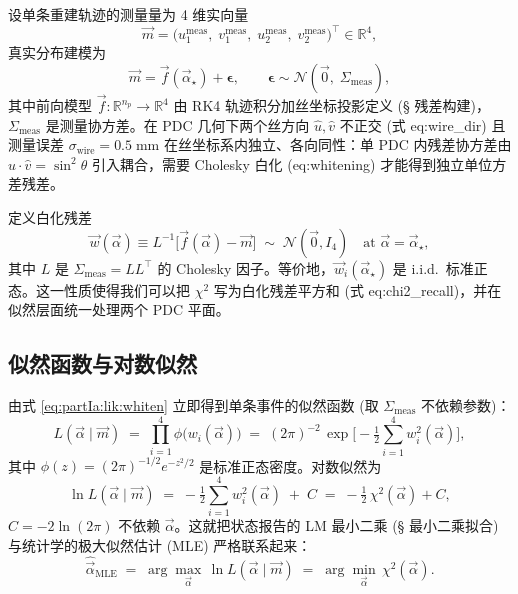 设单条重建轨迹的测量量为 4 维实向量
\begin{equation}
  \vec m = \bigl(u_1^\mathrm{meas},\; v_1^\mathrm{meas},\; u_2^\mathrm{meas},\; v_2^\mathrm{meas}\bigr)^\top \in \mathbb R^4,
  \label{eq:partIa:lik:meas}
\end{equation}
真实分布建模为
\begin{equation}
  \vec m = \vec f(\vec\alpha_\star) + \boldsymbol\epsilon,
  \qquad \boldsymbol\epsilon \sim \mathcal N(\vec 0,\;\Sigma_\mathrm{meas}),
  \label{eq:partIa:lik:gauss}
\end{equation}
其中前向模型 $\vec f:\mathbb R^{n_p}\to\mathbb R^4$ 由 RK4 轨迹积分加丝坐标投影定义 (\StatusReport § 残差构建)，$\Sigma_\mathrm{meas}$ 是测量协方差。在 PDC 几何下两个丝方向 $\hat u, \hat v$ 不正交 (式 \StatusReport eq:wire\_dir) 且测量误差 $\sigma_\mathrm{wire}=0.5\;\mathrm{mm}$ 在丝坐标系内独立、各向同性：单 PDC 内残差协方差由 $\hat u\cdot\hat v=\sin^2\theta$ 引入耦合，需要 Cholesky 白化 (\StatusReport eq:whitening) 才能得到独立单位方差残差。

定义白化残差
\begin{equation}
  \vec w(\vec\alpha) \equiv L^{-1}\bigl[\vec f(\vec\alpha)-\vec m\bigr]
  \;\sim\; \mathcal N(\vec 0, I_4)\quad\text{at }\vec\alpha=\vec\alpha_\star,
  \label{eq:partIa:lik:whiten}
\end{equation}
其中 $L$ 是 $\Sigma_\mathrm{meas}=LL^\top$ 的 Cholesky 因子。等价地，$\vec w_i(\vec\alpha_\star)$ 是 i.i.d.\ 标准正态。这一性质使得我们可以把 $\chi^2$ 写为白化残差平方和 (式 \StatusReport eq:chi2\_recall)，并在似然层面统一处理两个 PDC 平面。

\subsection{似然函数与对数似然}
\label{sec:partIa:lik:loglik}

由式 \eqref{eq:partIa:lik:whiten} 立即得到单条事件的似然函数 (取 $\Sigma_\mathrm{meas}$ 不依赖参数)：
\begin{equation}
  L(\vec\alpha\mid\vec m) \;=\; \prod_{i=1}^{4}\phi\bigl(w_i(\vec\alpha)\bigr)
  \;=\; (2\pi)^{-2}\,\exp\!\Biggl[-\tfrac12\sum_{i=1}^{4} w_i^2(\vec\alpha)\Biggr],
  \label{eq:partIa:lik:def}
\end{equation}
其中 $\phi(z)=(2\pi)^{-1/2}e^{-z^2/2}$ 是标准正态密度。对数似然为
\begin{equation}
  \ln L(\vec\alpha\mid\vec m)
  \;=\; -\tfrac12\sum_{i=1}^{4} w_i^2(\vec\alpha) \;+\; C
  \;=\; -\tfrac12\,\chi^2(\vec\alpha) + C,
  \label{eq:partIa:lik:loglik}
\end{equation}
$C=-2\ln(2\pi)$ 不依赖 $\vec\alpha$。这就把状态报告的 LM 最小二乘 (\StatusReport § 最小二乘拟合) 与统计学的极大似然估计 (MLE) 严格联系起来：
\begin{equation}
  \hat{\vec\alpha}_\mathrm{MLE} \;=\; \arg\max_{\vec\alpha}\,\ln L(\vec\alpha\mid\vec m)
  \;=\; \arg\min_{\vec\alpha}\,\chi^2(\vec\alpha).
  \label{eq:partIa:lik:mle}
\end{equation}

